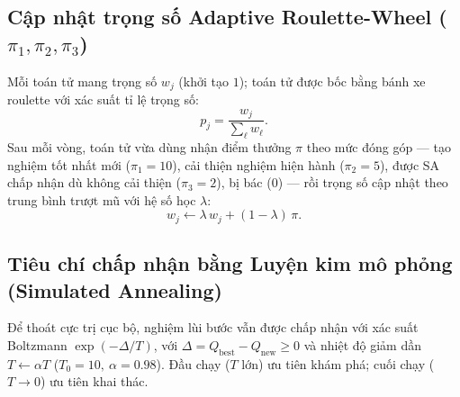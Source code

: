 \subsection{Cập nhật trọng số Adaptive Roulette-Wheel ($\pi_1,\pi_2,\pi_3$)}
Mỗi toán tử mang trọng số $w_j$ (khởi tạo $1$); toán tử được bốc bằng bánh xe
roulette với xác suất tỉ lệ trọng số:
\begin{equation}
  p_j = \frac{w_j}{\sum_\ell w_\ell}.
  \label{eq:roulette}
\end{equation}
Sau mỗi vòng, toán tử vừa dùng nhận điểm thưởng $\pi$ theo mức đóng góp --- tạo
nghiệm tốt nhất mới ($\pi_1{=}10$), cải thiện nghiệm hiện hành ($\pi_2{=}5$), được
SA chấp nhận dù không cải thiện ($\pi_3{=}2$), bị bác ($0$) --- rồi trọng số cập
nhật theo trung bình trượt mũ với hệ số học $\lambda$:
\begin{equation}
  w_j \leftarrow \lambda\,w_j + (1-\lambda)\,\pi.
  \label{eq:update}
\end{equation}

\subsection{Tiêu chí chấp nhận bằng Luyện kim mô phỏng (Simulated Annealing)}
Để thoát cực trị cục bộ, nghiệm lùi bước vẫn được chấp nhận với xác suất Boltzmann
$\exp(-\Delta/T)$, với $\Delta=Q_\text{best}-Q_\text{new}\ge 0$ và nhiệt độ giảm
dần $T\leftarrow\alpha T$ ($T_0{=}10,\ \alpha{=}0.98$). Đầu chạy ($T$ lớn) ưu tiên
khám phá; cuối chạy ($T\to 0$) ưu tiên khai thác.

